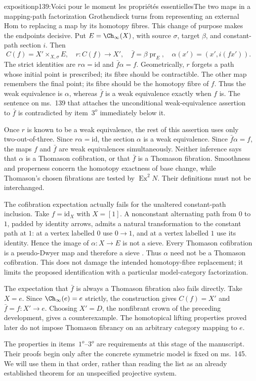 \begin{dcomment}{exposition}{p139:Voici pour le moment les propriétés essentielles}{The two maps in a mapping-path factorization}
Grothendieck turns from representing an external Hom to replacing a map by its homotopy fibres. This change of purpose makes the endpoints decisive. Put $E=\Ch_\infty(X)$, with source $\sigma$, target $\beta$, and constant-path section $i$. Then
\[
 C(f)=X'\times_{X,\sigma}E,
 \quad r:C(f)\longrightarrow X',
 \quad \bar f=\beta\operatorname{pr}_E,
 \quad \alpha(x')=(x',i(fx')).
\]
The strict identities are $r\alpha=\mathrm{id}$ and $\bar f\alpha=f$. Geometrically, $r$ forgets a path whose initial point is prescribed; its fibre should be contractible. The other map remembers the final point; its fibre should be the homotopy fibre of $f$. Thus the weak equivalence is $\alpha$, whereas $\bar f$ is a weak equivalence exactly when $f$ is. The sentence on ms.~139 that attaches the unconditional weak-equivalence assertion to $\bar f$ is contradicted by item~$3^o$ immediately below it.

Once $r$ is known to be a weak equivalence, the rest of this assertion uses only two-out-of-three. Since $r\alpha=\mathrm{id}$, the section $\alpha$ is a weak equivalence. Since $\bar f\alpha=f$, the maps $f$ and $\bar f$ are weak equivalences simultaneously. Neither inference says that $\alpha$ is a Thomason cofibration, or that $\bar f$ is a Thomason fibration. Smoothness and properness concern the homotopy exactness of base change, while Thomason's chosen fibrations are tested by $\operatorname{Ex}^2N$. Their definitions must not be interchanged.

The cofibration expectation actually fails for the unaltered constant-path inclusion. Take $f=\mathrm{id}_X$ with $X=[1]$. A nonconstant alternating path from $0$ to $1$, padded by identity arrows, admits a natural transformation to the constant path at $1$: at a vertex labelled $0$ use $0\to1$, and at a vertex labelled $1$ use its identity. Hence the image of $\alpha:X\to E$ is not a sieve. Every Thomason cofibration is a pseudo-Dwyer map and therefore a sieve \citep[\S2, following Proposition~2.4]{Raptis2010}. Thus $\alpha$ need not be a Thomason cofibration. This does not damage the intended homotopy-fibre replacement; it limits the proposed identification with a particular model-category factorization.

The expectation that $\bar f$ is always a Thomason fibration also fails directly. Take $X=e$. Since $\Ch_\infty(e)=e$ strictly, the construction gives $C(f)=X'$ and $\bar f=f:X'\to e$. Choosing $X'=D$, the nonfibrant crown of the preceding development, gives a counterexample. The homotopical lifting properties proved later do not impose Thomason fibrancy on an arbitrary category mapping to $e$.

The properties in items~$1^o$--$3^o$ are requirements at this stage of the manuscript. Their proofs begin only after the concrete symmetric model is fixed on ms.~145. We will use them in that order, rather than reading the list as an already established theorem for an unspecified projective system.
\end{dcomment}

